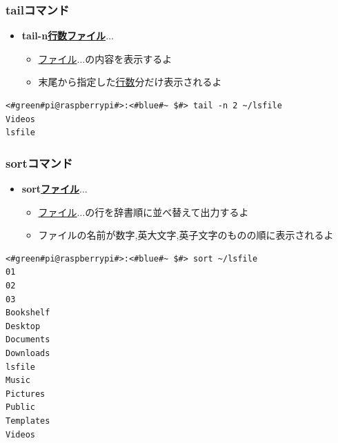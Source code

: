 \documentclass[slide03.tex]{subfiles}
\begin{document}
\begin{frame}[fragile]
    \frametitle{tailコマンド}
    \begin{itemize}
        \item {\bf tail\textvisiblespace -n\textvisiblespace\underline{行数}\textvisiblespace\underline{ファイル}$\ldots$}
        \begin{itemize}
            \small
            \item[] \underline{ファイル}$\ldots$の内容を表示するよ
            \item[] 末尾から指定した\underline{行数}分だけ表示されるよ
        \end{itemize}
    \end{itemize}
    \begin{lstlisting}[title=tailコマンドの実行例, label=tail_example]
<#green#pi@raspberrypi#>:<#blue#~ $#> tail -n 2 ~/lsfile
Videos
lsfile
    \end{lstlisting}
\end{frame}

\begin{frame}[fragile]
    \frametitle{sortコマンド}
    \begin{itemize}
        \item {\bf sort\textvisiblespace\underline{ファイル}$\ldots$}
        \begin{itemize}
            \small
            \item[] \underline{ファイル}$\ldots$の行を辞書順に並べ替えて出力するよ
            \item[] ファイルの名前が数字,英大文字,英子文字のものの順に表示されるよ
    \end{itemize}
\end{itemize}
\begin{lstlisting}[title=sortコマンドの実行例, label=sort_example]
<#green#pi@raspberrypi#>:<#blue#~ $#> sort ~/lsfile
01
02
03
Bookshelf
Desktop
Documents
Downloads
lsfile
Music
Pictures
Public
Templates
Videos
    \end{lstlisting}
\end{frame}
\end{document}

